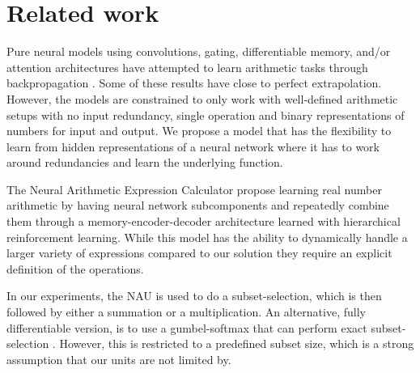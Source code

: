 \section{Related work}
Pure neural models using convolutions, gating, differentiable memory, and/or attention architectures have attempted to learn arithmetic tasks through backpropagation \cite{NeuralGPU,GridLSTM,NTM,FreivaldsL17}.
Some of these results have close to perfect extrapolation. However, the models are constrained to only work with well-defined arithmetic setups with no input redundancy, single operation and binary representations of numbers for input and output.
We propose a model that has the flexibility to learn from hidden representations of a neural network where it has to work around redundancies and learn the underlying function.

The Neural Arithmetic Expression Calculator \cite{NAEC} propose learning real number arithmetic by having neural network subcomponents and repeatedly combine them through a memory-encoder-decoder architecture learned with hierarchical reinforcement learning.
While this model has the ability to dynamically handle a larger variety of expressions compared to our solution they require an explicit definition of the operations.

In our experiments, the NAU is used to do a subset-selection, which is then followed by either a summation or a multiplication.
An alternative, fully differentiable version, is to use a gumbel-softmax that can perform exact subset-selection \cite{DSS}.
However, this is restricted to a predefined subset size, which is a strong assumption that our units are not limited by.